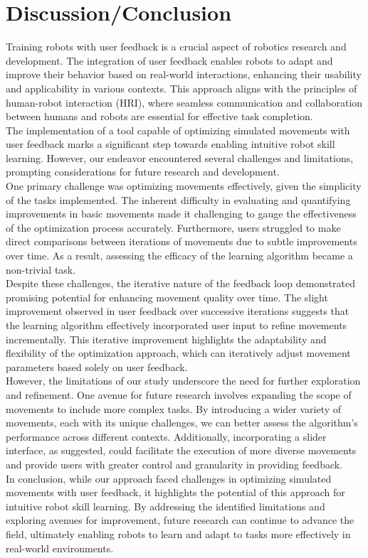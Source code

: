 \documentclass{article}
\begin{document}
\section{Discussion/Conclusion}

Training robots with user feedback is a crucial aspect of robotics research and development. The integration of user feedback enables robots to adapt and improve their behavior based on real-world interactions, enhancing their usability and applicability in various contexts. This approach aligns with the principles of human-robot interaction (HRI), where seamless communication and collaboration between humans and robots are essential for effective task completion.
\\
The implementation of a tool capable of optimizing simulated movements with user feedback marks a significant step towards enabling intuitive robot skill learning. However, our endeavor encountered several challenges and limitations, prompting considerations for future research and development.
\\
One primary challenge was optimizing movements effectively, given the simplicity of the tasks implemented. The inherent difficulty in evaluating and quantifying improvements in basic movements made it challenging to gauge the effectiveness of the optimization process accurately. Furthermore, users struggled to make direct comparisons between iterations of movements due to subtle improvements over time. As a result, assessing the efficacy of the learning algorithm became a non-trivial task.
\\
Despite these challenges, the iterative nature of the feedback loop demonstrated promising potential for enhancing movement quality over time. The slight improvement observed in user feedback over successive iterations suggests that the learning algorithm effectively incorporated user input to refine movements incrementally. This iterative improvement highlights the adaptability and flexibility of the optimization approach, which can iteratively adjust movement parameters based solely on user feedback.
\\
However, the limitations of our study underscore the need for further exploration and refinement. One avenue for future research involves expanding the scope of movements to include more complex tasks. By introducing a wider variety of movements, each with its unique challenges, we can better assess the algorithm's performance across different contexts. Additionally, incorporating a slider interface, as suggested, could facilitate the execution of more diverse movements and provide users with greater control and granularity in providing feedback.
\\
In conclusion, while our approach faced challenges in optimizing simulated movements with user feedback, it highlights the potential of this approach for intuitive robot skill learning. By addressing the identified limitations and exploring avenues for improvement, future research can continue to advance the field, ultimately enabling robots to learn and adapt to tasks more effectively in real-world environments.
\end{document}
